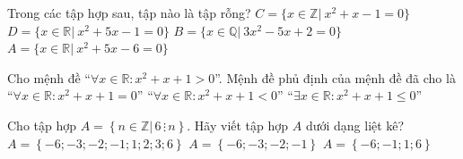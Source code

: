 \documentclass[12pt,a4paper,openany,oneside]{book}
\begin{document}
\begin{ex}%
	Trong các tập hợp sau, tập nào là  tập rỗng?
	 \choice
		 {\True $C=\{ x\in \mathbb{Z} |~ x^2+x-1=0  \}$}
		{$D=\{ x \in \mathbb{R} |~ x^2+5x-1=0 \}$}
		{$B=\{  x \in \mathbb{Q} |~ 3x^2-5x+2=0 \}$}
		{$A= \{ x \in \mathbb{R} |~ x^2+5x-6=0 \}$} 
\end{ex}

\begin{ex}%
	Cho mệnh đề ``$\forall x \in  \mathbb{R} : x^2+x+1>0$''. Mệnh đề phủ định của mệnh đề đã cho là
		 {``$\forall x \in \mathbb{R} :x^2+x+1 = 0$''}
		{``$\forall x \in \mathbb{R} :x^2+x+1 < 0$''}
		{\True ``$\exists x \in \mathbb{R} :x^2+x+1  \le 0$''}
\end{ex}

\begin{ex}%
	Cho tập hợp $A = \left\{n \in \mathbb{Z}\big| \,6 \, \vdots \, n\right\}$. Hãy  viết tập hợp $A$ dưới dạng liệt kê?
		 {\True $A =  \left\{-6;-3;-2;-1;1;2;3;6\right\}$}
		{$A = \left\{-6;-3;-2;-1\right\}$} 
		{$A  = \left\{-6;-1;1;6\right\}$}
\end{ex}
\end{document}

